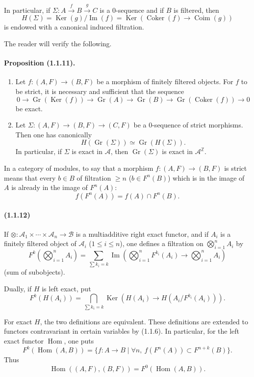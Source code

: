\documentclass[10pt]{article}
\newcommand{\Z}{\mathbb Z}
\newcommand{\Gr}{\operatorname{Gr}}
\newcommand{\Ker}{\operatorname{Ker}}
\newcommand{\Coker}{\operatorname{Coker}}
\newcommand{\Coim}{\operatorname{Coim}}
\newcommand{\Imop}{\operatorname{Im}}
\newcommand{\Hom}{\operatorname{Hom}}
\newcommand{\calA}{\mathcal A}
\newcommand{\calB}{\mathcal B}
\begin{document}
In particular, if $\Sigma:A\xrightarrow{f}B\xrightarrow{g}C$ is a $0$-sequence and if $B$ is filtered, then
\[
H(\Sigma)=\Ker(g)/\Imop(f)=\Ker(\Coker(f)\to\Coim(g))
\]
is endowed with a canonical induced filtration.

The reader will verify the following.

\paragraph{Proposition (1.1.11).} \begin{enumerate}[label=(\roman*)]
\item Let $f:(A,F)\to(B,F)$ be a morphism of finitely filtered objects. For $f$ to be strict, it is necessary and sufficient that the sequence
\[
0\to\Gr(\Ker(f))\to\Gr(A)\to\Gr(B)\to\Gr(\Coker(f))\to0
\]
be exact.
\item Let $\Sigma:(A,F)\to(B,F)\to(C,F)$ be a $0$-sequence of strict morphisms. Then one has canonically
\[
H(\Gr(\Sigma))\simeq\Gr(H(\Sigma)).
\]
In particular, if $\Sigma$ is exact in $\calA$, then $\Gr(\Sigma)$ is exact in $\calA^{\Z}$.
\end{enumerate}

In a category of modules, to say that a morphism $f:(A,F)\to(B,F)$ is strict means that every $b\in B$ of filtration $\ge n$ ($b\in F^n(B)$) which is in the image of $A$ is already in the image of $F^n(A)$:
\[
f(F^n(A))=f(A)\cap F^n(B).
\]

\paragraph{(1.1.12)} If $\otimes:\calA_1\times\cdots\times\calA_n\to\calB$ is a multiadditive right exact functor, and if $A_i$ is a finitely filtered object of $\calA_i$ ($1\le i\le n$), one defines a filtration on $\bigotimes_{i=1}^nA_i$ by
\[
F^k\left(\bigotimes_{i=1}^n A_i\right)=\sum_{\sum k_i=k}\Imop\left(\bigotimes_{i=1}^n F^{k_i}(A_i)\to\bigotimes_{i=1}^n A_i\right)
\]
(sum of subobjects).

Dually, if $H$ is left exact, put
\[
F^k(H(A_i))=\bigcap_{\sum k_i=k}\Ker\left(H(A_i)\to H(A_i/F^{k_i}(A_i))\right).
\]

For exact $H$, the two definitions are equivalent. These definitions are extended to functors contravariant in certain variables by (1.1.6). In particular, for the left exact functor $\Hom$, one puts
\[
F^k(\Hom(A,B))=\{f:A\to B\mid \forall n,\ f(F^n(A))\subset F^{n+k}(B)\}.
\]
Thus
\[
\Hom((A,F),(B,F))=F^0(\Hom(A,B)).
\]
\end{document}
